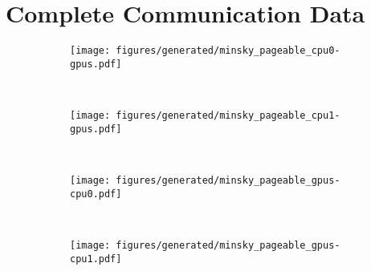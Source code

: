 \chapter{Complete Communication Data}
\label{ch:data}

\begin{figure}[ht]
    \centering
    \begin{subfigure}[b]{0.45\textwidth}
        \texttt{[image: figures/generated/minsky\_pageable\_cpu0-gpus.pdf]}
        \caption{}
        \label{}
    \end{subfigure}
    ~
    \begin{subfigure}[b]{0.45\textwidth}
        \texttt{[image: figures/generated/minsky\_pageable\_cpu1-gpus.pdf]}
        \caption{}
        \label{}
    \end{subfigure}
    \\
    \begin{subfigure}[b]{0.45\textwidth}
        \texttt{[image: figures/generated/minsky\_pageable\_gpus-cpu0.pdf]}
        \caption{}
        \label{}
    \end{subfigure}
    ~
    \begin{subfigure}[b]{0.45\textwidth}
        \texttt{[image: figures/generated/minsky\_pageable\_gpus-cpu1.pdf]}
        \caption{}
        \label{}
    \end{subfigure}
    \caption[]{}
    \label{fig:data-minsky-pageable}
\end{figure}